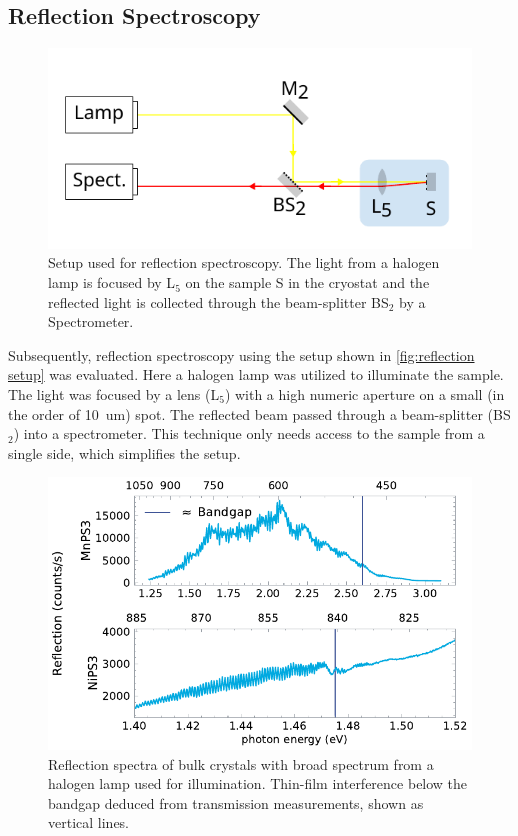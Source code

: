 \documentclass[
	twoside,
	parskip=half,
	a4paper,
]{scrbook}
\begin{document}
\subsection{Reflection Spectroscopy}
\begin{figure}
	\centering
	\includegraphics{../figures/setup_reflection.pdf}
	\caption{Setup used for reflection spectroscopy. The light from a halogen lamp is focused by L$_5$ on the sample S in the cryostat and the reflected light is collected through the beam-splitter BS$_2$ by a Spectrometer.}
	\label{fig:reflection setup}
\end{figure}
Subsequently, reflection spectroscopy using the setup shown in \autoref{fig:reflection setup} was evaluated.
Here a halogen lamp was utilized to illuminate the sample.
The light was focused by a lens (L$_5$) with a high numeric aperture on a small (in the order of \SI{10}{um}) spot.
The reflected beam passed through a beam-splitter (BS$_2$) into a spectrometer.
This technique only needs access to the sample from a single side, which simplifies the setup.
\begin{figure}
	\centering
	\includegraphics{../figures/2024-03-14 reflection spectra.pdf}
	\caption{Reflection spectra of bulk crystals with broad spectrum from a halogen lamp used for illumination. Thin-film interference below the bandgap deduced from transmission measurements, shown as vertical lines.}
	\label{fig:reflection spectra}
\end{figure}
\end{document}
